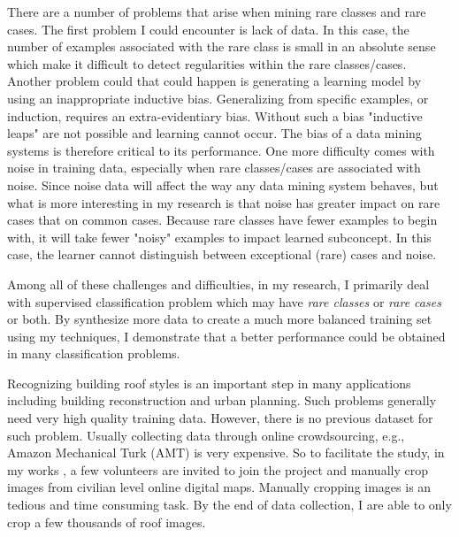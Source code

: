 \documentclass{iitthesis}
\begin{document}
There are a number of problems that arise when mining rare classes and rare cases. The first problem I could encounter is lack of data. In this case, the number of examples associated with the rare class is small in an absolute sense which make it difficult to detect regularities within the rare classes/cases. Another problem could that could happen is generating a learning model by using an inappropriate inductive bias. Generalizing from specific examples, or induction, requires an extra-evidentiary bias. Without such a bias "inductive leaps" are not possible and learning cannot occur. The bias of a data mining systems is therefore critical to its performance. One more difficulty comes with noise in training data, especially when rare classes/cases are associated with noise. Since noise data will affect the way any data mining system behaves, but what is more interesting in my research is that noise has greater impact on rare cases that on common cases. Because rare classes have fewer examples to begin with, it will take fewer "noisy" examples to impact learned subconcept. In this case, the learner cannot distinguish between exceptional (rare) cases and noise.

Among all of these challenges and difficulties, in my research, I primarily deal with supervised classification problem which may have \textit{rare classes} or \textit{rare cases} or both. By synthesize more data to create a much more balanced training set using my techniques, I demonstrate that a better performance could be obtained in many classification problems.

 Recognizing building roof styles is an important step in many applications including building reconstruction and urban planning. Such problems generally need very high quality training data. However, there is no previous dataset for such problem. Usually collecting data through online crowdsourcing, e.g., Amazon Mechanical Turk (AMT) is very expensive. So to facilitate the study, in my works \cite{AndiZang2015}\cite{Zhang2014Autoencoder}, a few volunteers are invited to join the project and manually crop images from civilian level online digital maps. Manually cropping images is an tedious and time consuming task. By the end of data collection, I are able to only crop a few thousands of roof images. 
\end{document}
